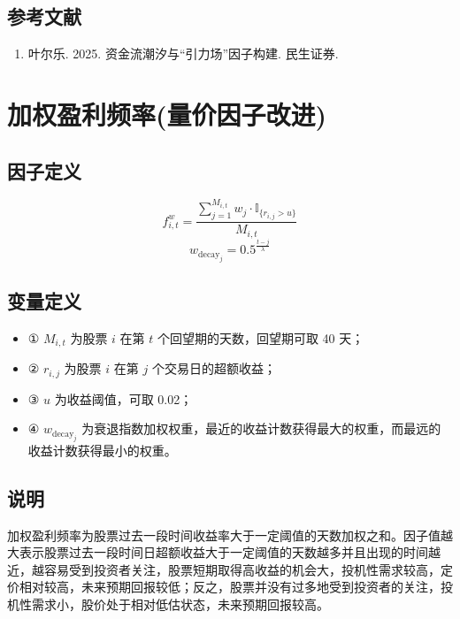 \documentclass{article}
\begin{document}
\subsection{参考文献}
\begin{enumerate}
    \item 叶尔乐. 2025. 资金流潮汐与“引力场”因子构建. 民生证券.
\end{enumerate}

\section{加权盈利频率(量价因子改进)}

\subsection{因子定义}
\begin{equation}
    f_{i,t}^w = \frac{\sum_{j=1}^{M_{i,t}} w_j \cdot \mathbb{I}_{\{r_{i,j} > u\}}}{M_{i,t}}
\end{equation}
\begin{equation}
    w_{\mathrm{decay}_j} = 0.5^{\frac{t-j}{\lambda}}
\end{equation}

\subsection{变量定义}
\begin{itemize}
    \item ① \( M_{i,t} \) 为股票 \( i \) 在第 \( t \) 个回望期的天数，回望期可取 40 天；
    \item ② \( r_{i,j} \) 为股票 \( i \) 在第 \( j \) 个交易日的超额收益；
    \item ③ \( u \) 为收益阈值，可取 0.02；
    \item ④ \( w_{\mathrm{decay}_j} \) 为衰退指数加权权重，最近的收益计数获得最大的权重，而最远的收益计数获得最小的权重。
\end{itemize}

\subsection{说明}
加权盈利频率为股票过去一段时间收益率大于一定阈值的天数加权之和。因子值越大表示股票过去一段时间日超额收益大于一定阈值的天数越多并且出现的时间越近，越容易受到投资者关注，股票短期取得高收益的机会大，投机性需求较高，定价相对较高，未来预期回报较低；反之，股票并没有过多地受到投资者的关注，投机性需求小，股价处于相对低估状态，未来预期回报较高。
\end{document}
